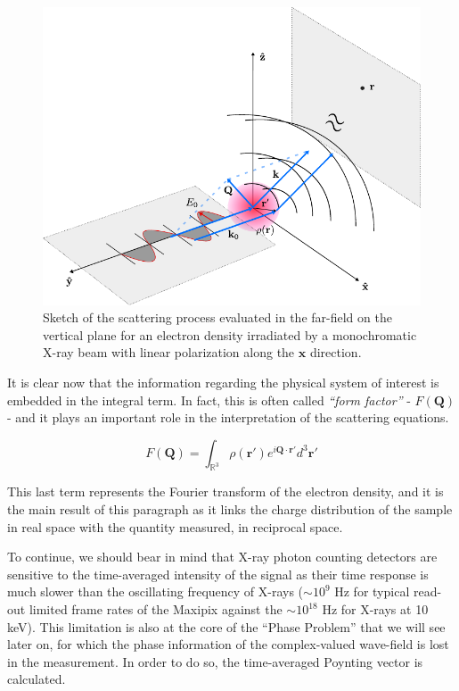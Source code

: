 \begin{figure}[H]
    \centering
    \includegraphics[width=\textwidth]{figures/Intro/scattering.pdf}
    \caption{Sketch of the scattering process evaluated in the far-field on the vertical plane for an electron density irradiated by a monochromatic X-ray beam 
    with linear polarization along the $\mathbf{\hat{x}}$ direction.}
    \label{fig:scattering}
\end{figure}

It is clear now that the information regarding the physical system of interest is embedded in the integral term. 
In fact, this is often called \textit{``form factor''} - $F(\mathbf Q)$ - and it plays an important role in the interpretation of the 
scattering equations. 

\begin{equation}
     F(\mathbf Q) = 
    \int_{\mathbb{R}^3} \rho(\mathbf r') e^{i \mathbf{Q} \cdot \mathbf{r}'}  d^3 \mathbf r'
    \label{eq:formfactor}
\end{equation}

This last term represents the Fourier transform of the electron density, and it is the main result of this paragraph as it 
links the charge distribution of the sample in real space with the quantity measured, in reciprocal space. 

To continue, we should bear in mind that X-ray photon counting detectors are sensitive to the time-averaged intensity 
of the signal as their time response is much slower than the oscillating frequency of X-rays ($\sim 10^{9}$ Hz for typical 
read-out limited frame rates of the Maxipix 
\cite{ponchut_maxipix_2011} against the $\sim 10^{18}$ Hz for X-rays at 10 keV). This limitation is also at the core of 
the ``Phase Problem'' that we will see later on, for which the phase information of the complex-valued wave-field is 
lost in the measurement. 
In order to do so, the time-averaged Poynting vector is calculated. 

